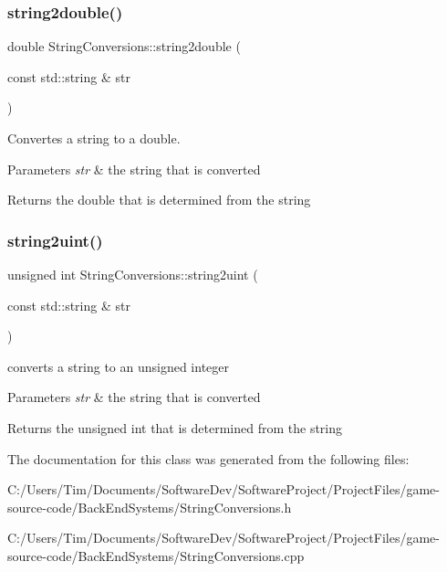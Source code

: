\subsubsection{\texorpdfstring{string2double()}{string2double()}}
{\footnotesize\ttfamily double String\+Conversions\+::string2double (\begin{DoxyParamCaption}\item[{const std\+::string \&}]{str }\end{DoxyParamCaption})\hspace{0.3cm}{\ttfamily [static]}}



Convertes a string to a double. 


\begin{DoxyParams}{Parameters}
{\em str} & the string that is converted \\
\hline
\end{DoxyParams}
\begin{DoxyReturn}{Returns}
the double that is determined from the string 
\end{DoxyReturn}
\mbox{\label{class_string_conversions_a74a58903eb2c9971a0fe3ededbde9504}} 
\subsubsection{\texorpdfstring{string2uint()}{string2uint()}}
{\footnotesize\ttfamily unsigned int String\+Conversions\+::string2uint (\begin{DoxyParamCaption}\item[{const std\+::string \&}]{str }\end{DoxyParamCaption})\hspace{0.3cm}{\ttfamily [static]}}



converts a string to an unsigned integer 


\begin{DoxyParams}{Parameters}
{\em str} & the string that is converted \\
\hline
\end{DoxyParams}
\begin{DoxyReturn}{Returns}
the unsigned int that is determined from the string 
\end{DoxyReturn}


The documentation for this class was generated from the following files\+:\begin{DoxyCompactItemize}
\item 
C\+:/\+Users/\+Tim/\+Documents/\+Software\+Dev/\+Software\+Project/\+Project\+Files/game-\/source-\/code/\+Back\+End\+Systems/String\+Conversions.\+h\item 
C\+:/\+Users/\+Tim/\+Documents/\+Software\+Dev/\+Software\+Project/\+Project\+Files/game-\/source-\/code/\+Back\+End\+Systems/String\+Conversions.\+cpp\end{DoxyCompactItemize}
